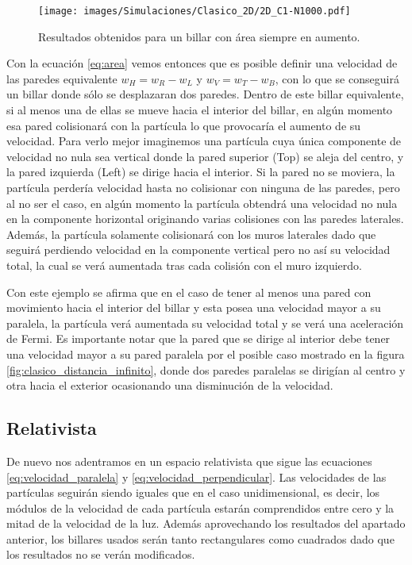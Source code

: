 \begin{figure}[H]
    \centering
    \texttt{[image: images/Simulaciones/Clasico\_2D/2D\_C1-N1000.pdf]}
    \caption{Resultados obtenidos para un billar con área siempre en aumento.}
    \label{fig:2D_C-N1000}
\end{figure}

Con la ecuación \ref{eq:area} vemos entonces que es posible definir una velocidad de las paredes equivalente \( {w_H =  w_R - w_L} \) y \( w_V = w_T - w_B \), con lo que se conseguirá un billar donde sólo se desplazaran dos paredes. Dentro de este billar equivalente, si al menos una de ellas se mueve hacia el interior del billar, en algún momento esa pared colisionará con la partícula lo que provocaría el aumento de su velocidad. Para verlo mejor imaginemos una partícula cuya única componente de velocidad no nula sea vertical donde la pared superior (Top) se aleja del centro, y la pared izquierda (Left) se dirige hacia el interior. Si la pared no se moviera, la partícula perdería velocidad hasta no colisionar con ninguna de las paredes, pero al no ser el caso, en algún momento la partícula obtendrá una velocidad no nula en la componente horizontal originando varias colisiones con las paredes laterales. Además, la partícula solamente colisionará con los muros laterales dado que seguirá perdiendo velocidad en la componente vertical pero no así su velocidad total, la cual se verá aumentada tras cada colisión con el muro izquierdo.

\vspace{3mm}

Con este ejemplo se afirma que en el caso de tener al menos una pared con movimiento hacia el interior del billar y esta posea una velocidad mayor a su paralela, la partícula verá aumentada su velocidad total y se verá una aceleración de Fermi. Es importante notar que la pared que se dirige al interior debe tener una velocidad mayor a su pared paralela por el posible caso mostrado en la figura \ref{fig:clasico_distancia_infinito}, donde dos paredes paralelas se dirigían al centro y otra hacia el exterior ocasionando una disminución de la velocidad.

\subsection{Relativista}

De nuevo nos adentramos en un espacio relativista que sigue las ecuaciones \ref{eq:velocidad_paralela} y \ref{eq:velocidad_perpendicular}. Las velocidades de las partículas seguirán siendo iguales que en el caso unidimensional, es decir, los módulos de la velocidad de cada partícula estarán comprendidos entre cero y la mitad de la velocidad de la luz. Además aprovechando los resultados del apartado anterior, los billares usados serán tanto rectangulares como cuadrados dado que los resultados no se verán modificados.

